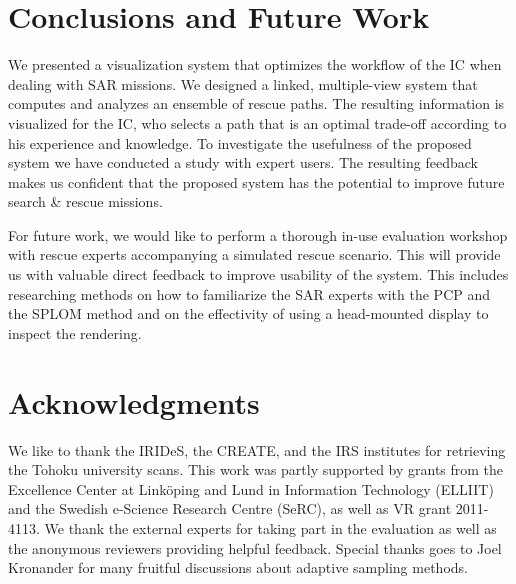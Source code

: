 \documentclass{egpubl}
\begin{document}
\section{Conclusions and Future Work} \label{sec:conclusion}
We presented a visualization system that optimizes the workflow of the IC when dealing with SAR missions. We designed a linked, multiple-view system that computes and analyzes an ensemble of rescue paths. The resulting information is visualized for the IC, who selects a path that is an optimal trade-off according to his experience and knowledge. To investigate the usefulness of the proposed system we have conducted a study with expert users. The resulting feedback makes us confident that the proposed system has the potential to improve future search \& rescue missions.

For future work, we would like to perform a thorough in-use evaluation workshop with rescue experts accompanying a simulated rescue scenario. This will provide us with valuable direct feedback to improve usability of the system. This includes researching methods on how to familiarize the SAR experts with the PCP and the SPLOM method and on the effectivity of using a head-mounted display to inspect the rendering.



\section*{Acknowledgments}
We like to thank the IRIDeS, the CREATE, and the IRS institutes for retrieving the Tohoku university scans. This work was partly supported by grants from the Excellence Center at Link\"oping and Lund in Information Technology (ELLIIT) and the Swedish e-Science Research Centre (SeRC), as well as VR grant 2011-4113. We thank the external experts for taking part in the evaluation as well as the anonymous reviewers providing helpful feedback. Special thanks goes to Joel Kronander for many fruitful discussions about adaptive sampling methods.

%


\end{document}
